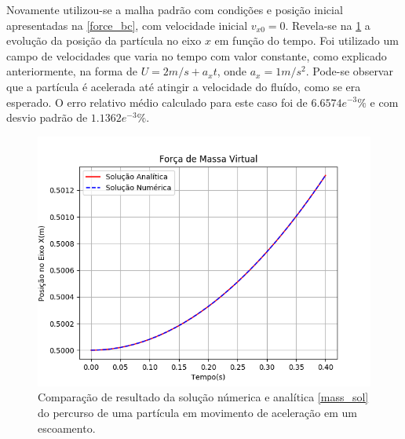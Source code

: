 Novamente utilizou-se a malha padrão com condições e posição inicial apresentadas na \ref{force_bc}, com velocidade inicial $v_{x0}=0$.
Revela-se na \ref{mass_comp} a evolução da posição da partícula no eixo $x$ em função do tempo.
Foi utilizado um campo de velocidades que varia no tempo com valor constante, como explicado anteriormente, na forma de $U=2m/s+a_x t$, onde $a_x=1m/s^2$.
Pode-se observar que a partícula é acelerada até atingir a velocidade do fluído, como se era esperado.
O erro relativo médio calculado para este caso foi de $6.6574e^{-3}\%$ e com desvio padrão de $1.1362e^{-3}\%$.
\begin{figure}[H]
    \centering
    \includegraphics[width=.7\linewidth]{figures/Forces_added_mass_validation.png}
    \caption{Comparação de resultado da solução númerica e analítica \ref{mass_sol} do percurso de uma partícula em movimento de aceleração em um escoamento.}
    \label{mass_comp}
\end{figure}